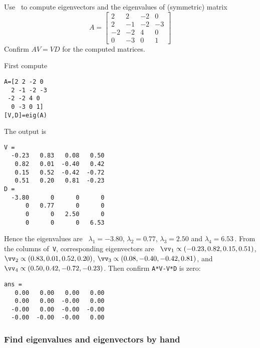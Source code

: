 \begin{example} \label{eg:}
Use \script\ to compute eigenvectors and the eigenvalues of (symmetric) matrix
\begin{equation*}
A=\begin{bmatrix} 2&2&-2&0
\\2&-1&-2&-3
\\-2&-2&4&0
\\0&-3&0&1
 \end{bmatrix}
\end{equation*}
Confirm \(AV=VD\) for the computed matrices.
\begin{solution} 
First compute
\setbox\ajrqrbox\hbox{}%
\marginpar{\usebox{\ajrqrbox}}%
\begin{verbatim}
A=[2 2 -2 0
  2 -1 -2 -3
 -2 -2 4 0
  0 -3 0 1]
[V,D]=eig(A)
\end{verbatim}
The output is \twodp
\begin{verbatim}
V =
  -0.23   0.83   0.08   0.50
   0.82   0.01  -0.40   0.42
   0.15   0.52  -0.42  -0.72
   0.51   0.20   0.81  -0.23
D =
  -3.80      0      0      0
      0   0.77      0      0
      0      0   2.50      0
      0      0      0   6.53
\end{verbatim}
Hence the eigenvalues are \twodp\ \(\lambda_1=-3.80\), \(\lambda_2=0.77\), \(\lambda_3=2.50\) and \(\lambda_4=6.53\)\,.
From the columns of~\verb|V|, corresponding eigenvectors are \twodp\  
\(\vv_1\propto(-0.23,0.82,0.15,0.51)\),
\(\vv_2\propto(0.83,0.01,0.52,0.20)\),
\(\vv_3\propto(0.08,-0.40,-0.42,0.81)\), and
\(\vv_4\propto(0.50,0.42,-0.72,-0.23)\).
Then confirm \verb|A*V-V*D| is zero:
\begin{verbatim}
ans =
   0.00   0.00   0.00   0.00
   0.00   0.00  -0.00   0.00
  -0.00   0.00  -0.00  -0.00
  -0.00  -0.00  -0.00   0.00
\end{verbatim}
\end{solution}
\end{example}








\subsubsection{Find eigenvalues and eigenvectors by hand}
\label{sec:feebh}

